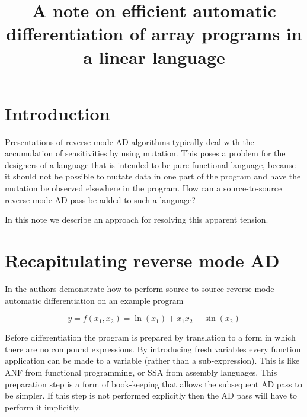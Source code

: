 \documentclass[12pt]{article}
\title{A note on efficient automatic differentiation of array programs
  in a linear language}
\begin{document}
\maketitle

\section{Introduction}

Presentations of reverse mode AD algorithms typically deal with the
accumulation of sensitivities by using mutation.  This poses a problem
for the designers of a language that is intended to be pure functional
language, because it should not be possible to mutate data in one part
of the program and have the mutation be observed elsewhere in the
program.  How can a source-to-source reverse mode AD pass be added to
such a language?

In this note we describe an approach for resolving this apparent
tension.

\section{Recapitulating reverse mode AD}

In \cite{adml} the authors demonstrate how to perform source-to-source
reverse mode automatic differentiation on an example program

\[
y = f(x_1, x_2) = \ln(x_1)+x_1 x_2-\sin(x_2)
\]

Before differentiation the program is prepared by translation to a
form in which there are no compound expressions.  By introducing fresh
variables every function application can be made to a variable (rather
than a sub-expression).  This is like ANF from functional programming,
or SSA from assembly languages.  This preparation step is a form of
book-keeping that allows the subsequent AD pass to be simpler.  If
this step is not performed explicitly then the AD pass will have to
perform it implicitly.

  \newcommand{\diff}[2]{
    \bar{v}_{#1} \frac{\partial v_{#1}}{\partial v_{#2}}
  }
\end{document}
